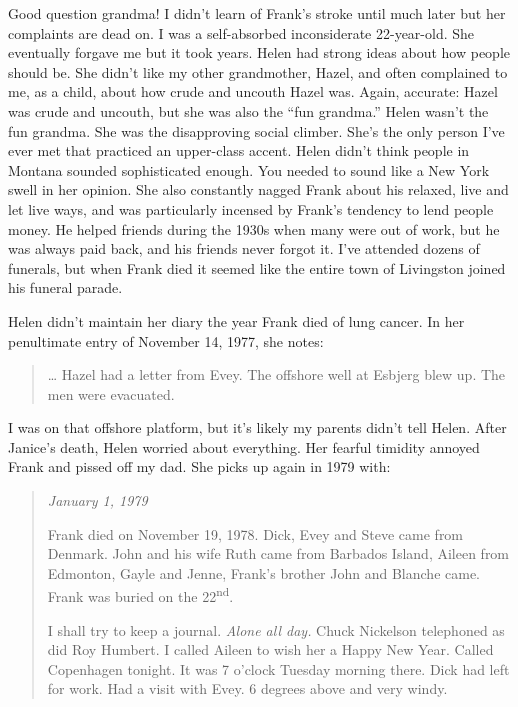 Good question grandma! I didn't learn of Frank's stroke until much later
but her complaints are dead on. I was a self-absorbed inconsiderate
22-year-old. She eventually forgave me but it took years. Helen had
strong ideas about how people should be. She didn't like my other
grandmother, Hazel, and often complained to me, as a child, about how
crude and uncouth Hazel was. Again, accurate: Hazel was crude and
uncouth, but she was also the ``fun grandma.'' Helen wasn't the fun
grandma. She was the disapproving social climber. She's the only person
I've ever met that practiced an upper-class accent. Helen didn't think
people in Montana sounded sophisticated enough. You needed to sound like
a New York swell in her opinion. She also constantly nagged Frank about
his relaxed, live and let live ways, and was particularly incensed by
Frank's tendency to lend people money. He helped friends during the
1930s when many were out of work, but he was always paid back, and his
friends never forgot it. I've attended dozens of funerals, but when
Frank died it seemed like the entire town of Livingston joined his
funeral parade.

Helen didn't maintain her diary the year Frank died of lung cancer. In
her penultimate entry of November 14, 1977, she notes:

\begin{quote}
\ldots{} Hazel had a letter from Evey. The offshore well at Esbjerg blew
up. The men were evacuated.
\end{quote}

I was on that offshore platform, but it's likely my parents didn't tell
Helen. After Janice's death, Helen worried about everything. Her fearful
timidity annoyed Frank and pissed off my dad. She picks up again in 1979
with:

\begin{quote}
\emph{January 1, 1979}

Frank died on November 19, 1978. Dick, Evey and Steve came from Denmark.
John and his wife Ruth came from Barbados Island, Aileen from Edmonton,
Gayle and Jenne, Frank's brother John and Blanche came. Frank was buried
on the 22\textsuperscript{nd}.

I shall try to keep a journal. \emph{Alone all day.} Chuck Nickelson telephoned
as did Roy Humbert. I called Aileen to wish her a Happy New Year. Called
Copenhagen tonight. It was 7 o'clock Tuesday morning there. Dick had
left for work. Had a visit with Evey. 6 degrees above and very windy.
\end{quote}


